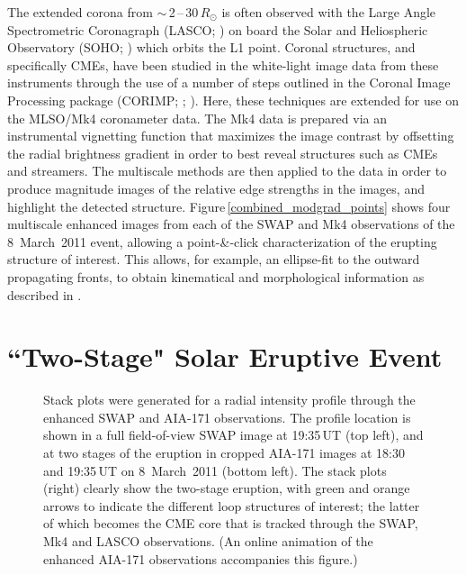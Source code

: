 \documentclass[namedreferences]{solarphysics}
\begin{document}
\begin{article}
The extended corona from $\sim$\,2\,--\,30\,$R_{\odot}$ is often observed with the Large Angle Spectrometric Coronagraph (LASCO; )  on board the Solar and Heliospheric Observatory (SOHO; ) which orbits the L1 point. Coronal structures, and specifically CMEs, have been studied in the white-light image data from these instruments through the use of a number of steps outlined in the Coronal Image Processing package (CORIMP; ; ). Here, these techniques are extended for use on the MLSO/Mk4 coronameter data. The Mk4 data is prepared via an instrumental vignetting function that maximizes the image contrast by offsetting the radial brightness gradient in order to best reveal structures such as CMEs and streamers. The multiscale methods are then applied to the data in order to produce magnitude images of the relative edge strengths in the images, and highlight the detected structure. Figure\,\ref{combined_modgrad_points} shows four multiscale enhanced images from each of the SWAP and Mk4 observations of the 8~March~2011 event, allowing a point-\&-click characterization of the erupting structure of interest. This allows, for example, an ellipse-fit to the outward propagating fronts, to obtain kinematical and morphological information as described in .



\section{``Two-Stage" Solar Eruptive Event}
\label{sect:event}

\begin{figure}[t]
\caption{Stack plots were generated for a radial intensity profile through the enhanced SWAP and AIA-171 observations. The profile location is shown in a full field-of-view SWAP image at 19:35\,UT (top left), and at two stages of the eruption in cropped AIA-171 images at 18:30 and 19:35\,UT on 8~March~2011 (bottom left). The stack plots (right) clearly show the two-stage eruption, with green and orange arrows to indicate the different loop structures of interest; the latter of which becomes the CME core that is tracked through the SWAP, Mk4 and LASCO observations. (An online animation of the enhanced AIA-171 observations accompanies this figure.)}
\label{stackplots}
\end{figure}


\end{article}
\end{document}
